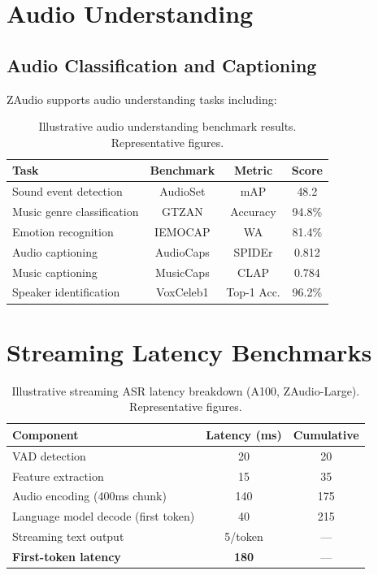 \documentclass[11pt,a4paper]{article}
\begin{document}
\section{Audio Understanding}

\subsection{Audio Classification and Captioning}

ZAudio supports audio understanding tasks including:

\begin{table}[H]
\centering
\caption{Illustrative audio understanding benchmark results. Representative figures.}
\label{tab:audio_understanding}
\begin{tabular}{lccc}
\toprule
Task & Benchmark & Metric & Score \\
\midrule
Sound event detection & AudioSet & mAP & 48.2 \\
Music genre classification & GTZAN & Accuracy & 94.8\% \\
Emotion recognition & IEMOCAP & WA & 81.4\% \\
Audio captioning & AudioCaps & SPIDEr & 0.812 \\
Music captioning & MusicCaps & CLAP & 0.784 \\
Speaker identification & VoxCeleb1 & Top-1 Acc. & 96.2\% \\
\bottomrule
\end{tabular}
\end{table}

\section{Streaming Latency Benchmarks}

\begin{table}[H]
\centering
\caption{Illustrative streaming ASR latency breakdown (A100, ZAudio-Large). Representative figures.}
\label{tab:latency}
\begin{tabular}{lcc}
\toprule
Component & Latency (ms) & Cumulative \\
\midrule
VAD detection & 20 & 20 \\
Feature extraction & 15 & 35 \\
Audio encoding (400ms chunk) & 140 & 175 \\
Language model decode (first token) & 40 & 215 \\
Streaming text output & 5/token & — \\
\midrule
\textbf{First-token latency} & \textbf{180} & — \\
\bottomrule
\end{tabular}
\end{table}
\end{document}
